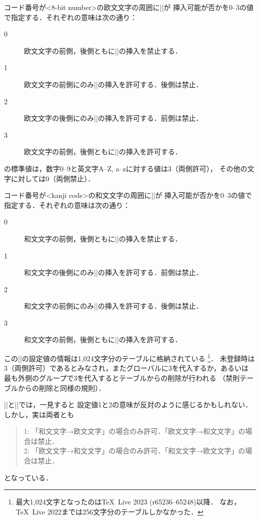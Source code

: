 \documentclass[a4paper,11pt,nomag,dvipdfmx]{jsarticle}
\begin{document}
\begin{cslist}
\csitem[\.{xspcode} <8-bit number>=<0--3>]
  コード番号が<8-bit number>の欧文文字の周囲に|\xkanjiskip|が
  挿入可能が否かを0--3の値で指定する．それぞれの意味は次の通り：
  \begin{description}
    \item[0] 欧文文字の前側，後側ともに|\xkanjiskip|の挿入を禁止する．
    \item[1] 欧文文字の前側にのみ|\xkanjiskip|の挿入を許可する．後側は禁止．
    \item[2] 欧文文字の後側にのみ|\xkanjiskip|の挿入を許可する．前側は禁止．
    \item[3] 欧文文字の前側，後側ともに|\xkanjiskip|の挿入を許可する．
  \end{description}
  \pTeX の標準値は，数字0--9と英文字A--Z, a--zに対する値は3（両側許可），
  その他の文字に対しては0（両側禁止）．

\csitem[\.{inhibitxspcode} <kanji code>=<0--3>]
  コード番号が<kanji code>の和文文字の周囲に|\xkanjiskip|が
  挿入可能が否かを0--3の値で指定する．それぞれの意味は次の通り：
  \begin{description}
    \item[0] 和文文字の前側，後側ともに|\xkanjiskip|の挿入を禁止する．
    \item[1] 和文文字の後側にのみ|\xkanjiskip|の挿入を許可する．前側は禁止．
    \item[2] 和文文字の前側にのみ|\xkanjiskip|の挿入を許可する．後側は禁止．
    \item[3] 和文文字の前側，後側ともに|\xkanjiskip|の挿入を許可する．
  \end{description}
  この|\inhibitxspcode|の設定値の情報は1,024文字分のテーブルに格納されている
  \footnote{最大1,024文字となったのは\TeX~Live 2023 (r65236--65248)以降．
  なお，\TeX~Live 2022までは256文字分のテーブルしかなかった．}．
  未登録時は3（両側許可）であるとみなされ，またグローバルに3を代入するか，あるいは
  最も外側のグループで3を代入するとテーブルからの削除が行われる
  （禁則テーブルからの削除と同様の規則）．
\end{cslist}
\begin{dangerous}
  |\xspcode|と|\inhibitxspcode|では，一見すると
  設定値1と2の意味が反対のように感じるかもしれない．しかし，実は両者とも
  \begin{quote}
    1: 「和文文字→欧文文字」の場合のみ許可．「欧文文字→和文文字」の場合は禁止．\\
    2: 「欧文文字→和文文字」の場合のみ許可．「和文文字→欧文文字」の場合は禁止．
  \end{quote}
  となっている．
\end{dangerous}
\end{document}
